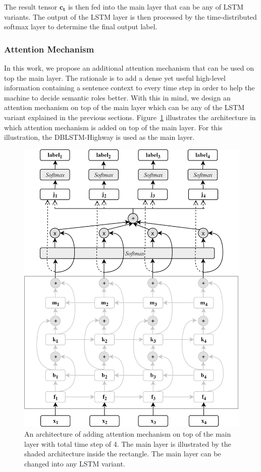The result tensor $\mathbf{c_{t}}$ is then fed into the main layer that can be any of LSTM variants. The output of the LSTM layer is then processed by the time-distributed softmax layer to determine the final output label.

\subsubsection{Attention Mechanism}
In this work, we propose an additional attention mechanism that can be used on top the main layer. The rationale is to add a dense yet useful high-level information containing a sentence context to every time step in order to help the machine to decide semantic roles better. With this in mind, we design an attention mechanism on top of the main layer which can be any of the LSTM variant explained in the previous sections. Figure~\ref{fig:dblstmhighwayattention} illustrates the architecture in which attention mechanism is added on top of the main layer. For this illustration, the DBLSTM-Highway is used as the main layer.

\begin{figure}
	\centering
	\includegraphics[width=0.75\linewidth]{images/dblstmhighwayattention}
	\caption{An architecture of adding attention mechanism on top of the main layer with total time step of 4. The main layer is illustrated by the shaded architecture inside the rectangle. The main layer can be changed into any LSTM variant.}
	\label{fig:dblstmhighwayattention}
\end{figure}

